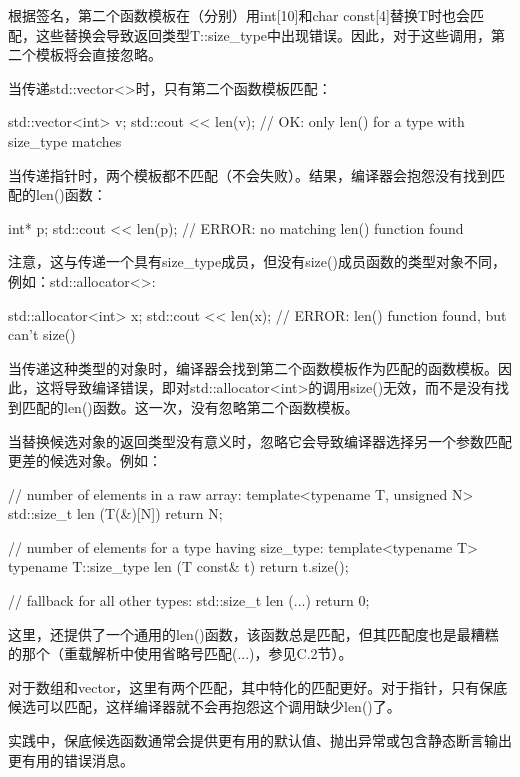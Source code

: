 根据签名，第二个函数模板在（分别）用int[10]和char const[4]替换T时也会匹配，这些替换会导致返回类型T::size\_type中出现错误。因此，对于这些调用，第二个模板将会直接忽略。

当传递std::vector<>时，只有第二个函数模板匹配：

\begin{cpp}
std::vector<int> v;
std::cout << len(v); // OK: only len() for a type with size_type matches
\end{cpp}

当传递指针时，两个模板都不匹配（不会失败）。结果，编译器会抱怨没有找到匹配的len()函数：

\begin{cpp}
int* p;
std::cout << len(p); // ERROR: no matching len() function found
\end{cpp}

注意，这与传递一个具有size\_type成员，但没有size()成员函数的类型对象不同，例如：std::allocator<>:

\begin{cpp}
std::allocator<int> x;
std::cout << len(x); // ERROR: len() function found, but can't size()
\end{cpp}

当传递这种类型的对象时，编译器会找到第二个函数模板作为匹配的函数模板。因此，这将导致编译错误，即对std::allocator<int>的调用size()无效，而不是没有找到匹配的len()函数。这一次，没有忽略第二个函数模板。

当替换候选对象的返回类型没有意义时，忽略它会导致编译器选择另一个参数匹配更差的候选对象。例如：

\begin{cpp}
// number of elements in a raw array:
template<typename T, unsigned N>
std::size_t len (T(&)[N]) {
	return N;
}

// number of elements for a type having size_type:
template<typename T>
typename T::size_type len (T const& t) {
	return t.size();
}

// fallback for all other types:
std::size_t len (...) {
	return 0;
}
\end{cpp}

这里，还提供了一个通用的len()函数，该函数总是匹配，但其匹配度也是最糟糕的那个（重载解析中使用省略号匹配(...)，参见C.2节）。

对于数组和vector，这里有两个匹配，其中特化的匹配更好。对于指针，只有保底候选可以匹配，这样编译器就不会再抱怨这个调用缺少len()了。

\begin{notice}
实践中，保底候选函数通常会提供更有用的默认值、抛出异常或包含静态断言输出更有用的错误消息。
\end{notice}

